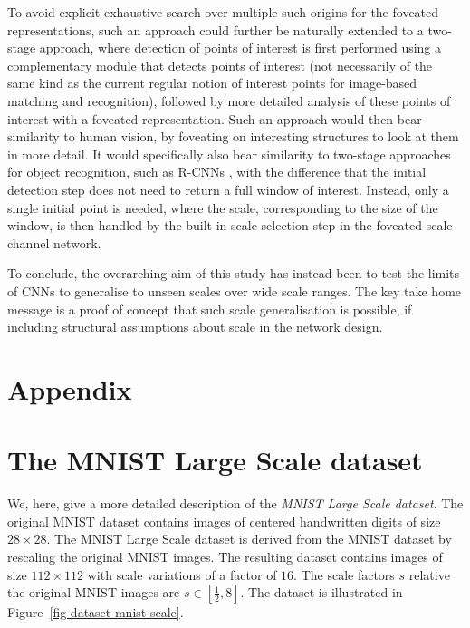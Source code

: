 \documentclass[twocolumn,runningheads]{svjour3}
\begin{document}
To avoid
explicit exhaustive search over multiple such origins for the foveated
representations, such an approach could further be naturally extended to a
two-stage approach, where
detection of points of interest is first performed using a
complementary module that detects points of interest (not
necessarily of the same kind as the current regular notion of interest points for
image-based matching and recognition),
followed by more detailed analysis of these points of interest with a
foveated representation. Such an approach would then bear
similarity to human vision, by foveating on interesting structures
to look at them in more detail. It would specifically also bear similarity to
two-stage approaches for object recognition, such as R-CNNs
\cite{GirDonDarMal14-CVPR,Gir15-ICCV,RenHeGirSun17-PAMI}, with the
difference that the initial detection step does not need to return
a full window of interest. Instead, only a single initial point is needed, where
the scale, corresponding to the size of the window, is then handled
by the built-in scale selection step in the foveated scale-channel
network. 

To conclude, the overarching aim of this study has instead been to test the limits of
CNNs to generalise to unseen scales over wide scale ranges. The key
take home message is a proof of concept that such scale generalisation is
possible, if including structural assumptions about scale in the
network design. 

\appendix
\normalsize

\section*{Appendix}

\section{The MNIST Large Scale dataset}
\label{app-mnist-large-scale}

We, here, give a more detailed description of the {\em MNIST Large Scale dataset\/}. 
The original MNIST dataset \cite{LecBotBenHaf98-ProcIEEE} contains images
of centered handwritten digits of size $28\times28$. 
The MNIST Large Scale dataset is derived from the MNIST dataset by
rescaling the original MNIST images. 
The resulting dataset contains images of size $112 \times 112$ with
scale variations of a factor of $16$. 
The scale factors $s$ relative the original MNIST images are $s \in
[\frac{1}{2}, 8]$. 
The dataset is illustrated in Figure~\ref{fig-dataset-mnist-scale}.
	
\end{document}
